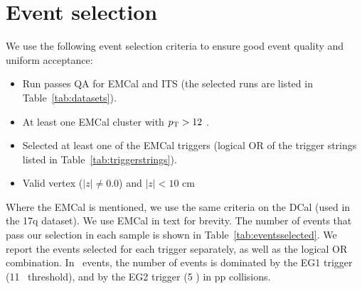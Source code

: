 
\section{Event selection}
\label{sec:eventselection}
We use the following event selection criteria to ensure good event quality and uniform acceptance:
\begin{itemize}
\item Run passes QA for EMCal and ITS (the selected runs are listed in Table~\ref{tab:datasets}).
\item At least one EMCal cluster with $p_{\mathrm{T}}>12$ \GeVc.
\item Selected at least one of the EMCal triggers (logical OR of the trigger strings listed in Table~\ref{tab:triggerstrings}).  %
\item Valid vertex ($|z|\neq0.0$) and $|z|<10$ cm 
\end{itemize}

Where the EMCal is mentioned, we use the same criteria on the DCal (used in the 17q dataset). We use EMCal in text for brevity.
The number of events that pass our selection in each sample is shown in Table~\ref{tab:eventsselected}. We report the events selected for each trigger separately, as well as the logical OR combination. In \pPb~events, the number of events is dominated by the EG1 trigger (11 \GeVc~threshold), and by the EG2 trigger (5 \GeVc) in pp collisions. 

